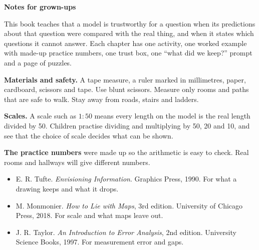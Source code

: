 \vspace{0.4em}
{\sans\bfseries\large\color{sky!70!black} Notes for grown-ups}\par
This book teaches that a model is trustworthy for a question when its predictions about that question were compared with the real thing, and when it states which questions it cannot answer. Each chapter has one activity, one worked example with made-up practice numbers, one trust box, one ``what did we keep?'' prompt and a page of puzzles.

\textbf{Materials and safety.} A tape measure, a ruler marked in millimetres, paper, cardboard, scissors and tape. Use blunt scissors. Measure only rooms and paths that are safe to walk. Stay away from roads, stairs and ladders.

\textbf{Scales.} A scale such as $1:50$ means every length on the model is the real length divided by 50. Children practise dividing and multiplying by 50, 20 and 10, and see that the choice of scale decides what can be shown.

\textbf{The practice numbers} were made up so the arithmetic is easy to check. Real rooms and hallways will give different numbers.

\begin{itemize}[leftmargin=1.3em,itemsep=0.2em]
\item E. R. Tufte. \emph{Envisioning Information}. Graphics Press, 1990. For what a drawing keeps and what it drops.
\item M. Monmonier. \emph{How to Lie with Maps}, 3rd edition. University of Chicago Press, 2018. For scale and what maps leave out.
\item J. R. Taylor. \emph{An Introduction to Error Analysis}, 2nd edition. University Science Books, 1997. For measurement error and gaps.
\end{itemize}

\clearpage
\thispagestyle{blank}
